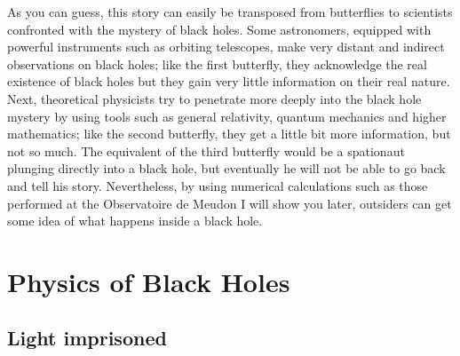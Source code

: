 \documentclass{lamuphys}
\begin{document}
As you can guess, this story can easily be transposed from butterflies to
scientists confronted with the mystery of black holes. Some
astronomers, equipped with powerful instruments such as orbiting telescopes,
make very distant and indirect observations on black holes; like the first
butterfly, they acknowledge the real existence of black holes but they gain
very little information on their real nature. Next, theoretical physicists try
to penetrate more deeply into the black hole mystery by using tools such as
general relativity, quantum mechanics and higher mathematics; like the second
butterfly, they get a little bit more information, but not so much. The
equivalent of the third butterfly would be a spationaut plunging directly into
a black hole, but eventually he will not be able to go back and tell his story.
Nevertheless, by using numerical calculations such as those performed at the
Observatoire de Meudon I will show you later, outsiders can get some idea of what
happens inside a black hole. 

\section {Physics of Black Holes}

\subsection {Light imprisoned}
 
\end{document}
